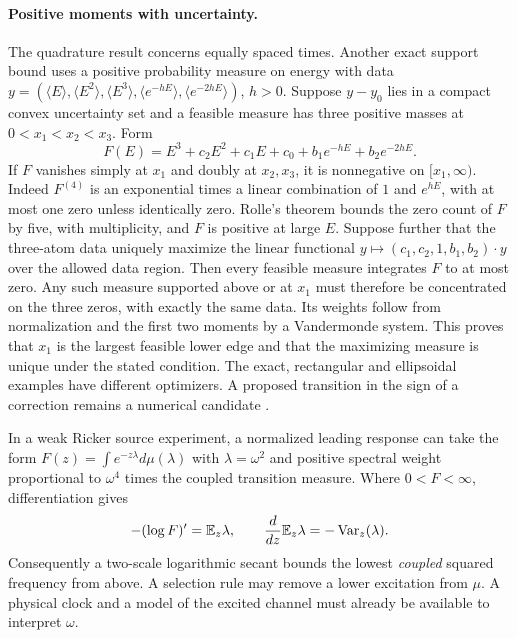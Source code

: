 \documentclass[11pt,letterpaper]{article}
\begin{document}
\paragraph{Positive moments with uncertainty.}
The quadrature result concerns equally spaced times. Another exact support bound uses a positive probability measure on energy with data
$y=(\langle E\rangle,\langle E^2\rangle,\langle E^3\rangle,\langle e^{-hE}\rangle,\langle e^{-2hE}\rangle)$, $h>0$. Suppose $y-y_0$ lies in a compact convex uncertainty set and a feasible measure has three positive masses at $0<x_1<x_2<x_3$. Form
\[
 F(E)=E^3+c_2E^2+c_1E+c_0+b_1e^{-hE}+b_2e^{-2hE}.
\]
If $F$ vanishes simply at $x_1$ and doubly at $x_2,x_3$, it is nonnegative on $[x_1,\infty)$. Indeed $F^{(4)}$ is an exponential times a linear combination of $1$ and $e^{hE}$, with at most one zero unless identically zero. Rolle's theorem bounds the zero count of $F$ by five, with multiplicity, and $F$ is positive at large $E$. Suppose further that the three-atom data uniquely maximize the linear functional $y\mapsto(c_1,c_2,1,b_1,b_2)\cdot y$ over the allowed data region. Then every feasible measure integrates $F$ to at most zero. Any such measure supported above or at $x_1$ must therefore be concentrated on the three zeros, with exactly the same data. Its weights follow from normalization and the first two moments by a Vandermonde system. This proves that $x_1$ is the largest feasible lower edge and that the maximizing measure is unique under the stated condition. The exact, rectangular and ellipsoidal examples have different optimizers. A proposed transition in the sign of a correction remains a numerical candidate \cite{spectral}.

In a weak Ricker source experiment, a normalized leading response can take the form $F(z)=\int e^{-z\lambda}d\mu(\lambda)$ with $\lambda=\omega^2$ and positive spectral weight proportional to $\omega^4$ times the coupled transition measure. Where $0<F<\infty$, differentiation gives
\[
 -(\log F)'=\mathbb E_z\lambda,\qquad \frac{d}{dz}\mathbb E_z\lambda=-\operatorname{Var}_z(\lambda).
\]
Consequently a two-scale logarithmic secant bounds the lowest \emph{coupled} squared frequency from above. A selection rule may remove a lower excitation from $\mu$. A physical clock and a model of the excited channel must already be available to interpret $\omega$.
\end{document}
